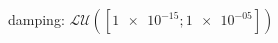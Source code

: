 damping: $\mathcal{LU}([\num[scientific-notation=true]{1e-15}; \num[scientific-notation=true]{1e-05}])$